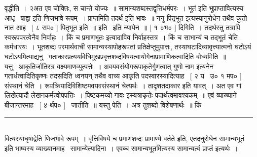 \documentclass[11pt, openany]{book}
\begin{document}
\begin{multicols}{2}
\noindent
[ ७ भप० ] वृद्धीति~। २अत एव चोक्तिः, स चान्ते योज्यः~॥ सामान्यशब्दस्तद्वृत्तिधर्मपरः~। {\qt भूतं} इति भूप्राप्तावित्यस्य आधृ \textendash\  षाद्वा इति णिजभावे रूपम्~। प्राप्तमिति तदर्थ इति भावः~॥ ननु पितृभूत इत्यस्यानुरोधेन तथैव कुतो नात आह \textendash\ [ ८ सप० ] पितृभूत इति~॥ इति \textendash\ इति न्यायेन~॥ [ १ ०भ० ] दिगिति~। तदर्थस्तु तत्रापि स्वरूपपरत्वेनैव निर्वाहः~। किं च {\qt प्रमाणभूतः} इत्यादाविव निर्वाहस्तत्र~।  किं च साभान्यं च तद्भूतं चेति कर्मधारयः~। भूतशब्दः परमार्थवाची सामान्यस्यापोहरूपतां प्रतिक्षेप्तुमुपात्तः, तस्याघटादिव्यावृत्त्यात्मनो घटोऽयं घटोऽयमित्याद्यनु \textendash\ गताकारप्रत्ययविधिमुखप्रवृत्तशब्दविषयत्वायोगेनाप्रामाणिकत्वादिति बोध्यमिति~॥\\

यत्तु \textendash\ आकृतिर्जातिरत्र वक्ष्यमाणव्युत्पत्तेः~। अवयवसंयोगरूपाकृतेर्गुणत्वात् {\qt गुणो नाम} इत्यनेन गतार्धत्वादितिकृष्णः तदसदिति ध्वनयन् तथैव वाच्य आकृति पदस्वारस्यादित्याह \textendash\ [ २ य \textendash\ उ० १ मप० ] संस्थानं चेति~। रूपक्रियादिविशिष्टमवयवसंस्थानं चेत्यर्थः~।  तादृशतदाकार इति यावत्~। अत एव गां लिखेत्यादौ लेखनकर्मत्वोपपत्तिः~। {\qt पिष्टकमय्यो गावः} इस्यत्राकृतेः पदार्थत्वमावश्यकम्~॥ एवं व्याख्याने बीजान्तरमाह \textendash\ [ ४ र्थप० ] \textendash\ जातीति~॥ यस्तु पेति~। अत्र {\qt तुशब्दो विशेषणार्थः~॥} किं

\noindent
\rule{1\linewidth}{0.5pt}\\

\noindent
वित्यस्याधृषाद्वेति णिजभावे रूपम्~। वृत्तिविषये च प्रमाणशब्दः {\qt प्रामाण्ये वर्तते} इति, एतदनुरोधेन {\qt सामान्यभूतं} इति भाष्यस्य व्याख्यानमाह \textendash\ सामान्येत्यादिना~। एवब्च सामान्यभूतमित्यस्य {\qt सामान्यत्वं प्राप्तं} इत्यर्थः~।
\end{multicols}

\newpage
\end{document}
